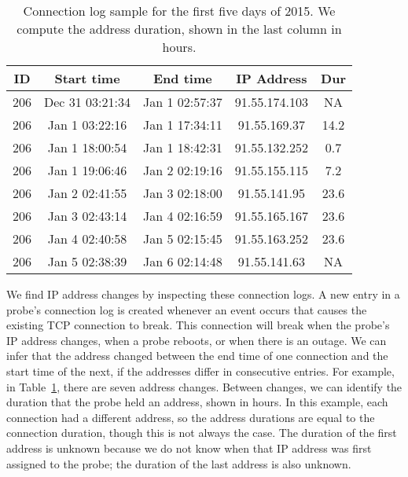 \begin{table}[th]
  \scriptsize
  \centering
  \hspace{-0.04in}\begin{tabular}{c|c|c|c|c}
    \textbf{ID} & \textbf{Start time} & \textbf{End time} & \textbf{IP Address} & \textbf{Dur}\\
    \hline
    206 & Dec 31 03:21:34&Jan 1 02:57:37 & 91.55.174.103 & NA\\
    206 &  Jan 1 03:22:16 & Jan 1 17:34:11 & 91.55.169.37 & 14.2\\
    206 &  Jan 1 18:00:54 & Jan 1 18:42:31 & 91.55.132.252 & 0.7\\
    206 &  Jan 1 19:06:46 & Jan 2 02:19:16 & 91.55.155.115 & 7.2\\
    206 &  Jan 2 02:41:55 & Jan 3 02:18:00 & 91.55.141.95 & 23.6\\
    206 & Jan 3 02:43:14 & Jan 4 02:16:59 & 91.55.165.167 & 23.6\\
    206 & Jan 4 02:40:58 & Jan 5 02:15:45 & 91.55.163.252 & 23.6\\
    206 & Jan 5 02:38:39 & Jan 6 02:14:48 & 91.55.141.63 & NA\\
    \end{tabular}
  \caption[RIPE Atlas Connection log sample]{\label{tbl:sample}Connection log sample for the first five
    days of 2015. We compute the address duration, shown in the last column in hours.}
    
\end{table}


We find IP address changes by inspecting these connection
logs. A new entry in a probe's connection log is created
whenever an event occurs that causes the existing TCP
connection to break.  This connection will break when the
probe's IP address changes, when a probe reboots, or when
there is an outage.  We can infer that the address changed
between the end time of one connection and the start time of
the next, if the addresses differ in consecutive entries.  For example, in
Table~\ref{tbl:sample}, there are seven address changes.
Between changes, we can identify the duration that the probe
held an address, shown in hours.  In this example, each connection
had a different address, so the address durations are equal to the
connection duration, though this is not always the case.
The duration of the first
address is unknown because we do not know when that IP
address was first assigned to the probe; the duration of the
last address is also unknown. 

